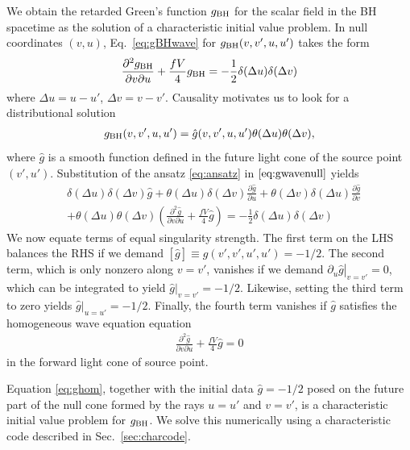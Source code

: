 \begin{refsection}
We obtain the retarded Green's function $g_{\rm BH}$ for the scalar field in the BH spacetime as the solution of a characteristic initial value problem.
In null coordinates $(v,u)$, Eq.~\eqref{eq:gBHwave} for $g_{\rm BH}(v,v',u,u')$ takes the form
\begin{align}
\frac{\partial ^2 g_{\rm BH}}{\partial v\partial u}+\frac{fV}{4}g_{\rm BH}=-\frac{1}{2}\delta(\Delta u)\delta(\Delta v) \label{eq:gwavenull}
\end{align}
where $\Delta u =u-u'$, $\Delta v =v-v'$. 
Causality motivates us to look for a distributional solution
\begin{align}
g_{\rm BH}(v,v',u,u')=\hat g(v,v',u,u')\theta(\Delta u)\theta(\Delta v), \label{eq:ansatz}
\end{align}
where $\hat g$ is a smooth function defined in the future light cone of the source point $(v',u')$. Substitution of the ansatz \eqref{eq:ansatz} in $\eqref{eq:gwavenull}$ yields
\begin{align}
&\delta (\Delta u)\delta(\Delta v)\hat g+\theta(\Delta u)\delta(\Delta v)\frac{\partial \hat g}{\partial u} +\theta(\Delta v)\delta (\Delta u)\frac{\partial \hat g}{\partial v} \nonumber \\
&+\theta(\Delta u)\theta(\Delta v)\left(\frac{\partial ^2 \hat g}{\partial v\partial u}+\frac{fV}{4}\hat g\right)=-\frac{1}{2}\delta (\Delta u)\delta(\Delta v)
\end{align}
We now equate terms of equal singularity strength.
The first term on the LHS balances the RHS if we demand $[\hat g]\equiv g(v',v',u',u')=-1/2$. The second term, which is only nonzero along $v=v'$, vanishes if we demand $\left.\partial_u \hat g\right |_{v=v'}=0$, which can be integrated to yield $\hat g|_{v=v'}=-1/2$. Likewise, setting the third term to zero yields $\hat g|_{u=u'}=-1/2$. Finally, the fourth term vanishes if $\hat g$ satisfies the homogeneous wave equation equation 
\begin{align}
\frac{\partial ^2 \hat g}{\partial v\partial u}+\frac{fV}{4}\hat g =0 
\label{eq:ghom}
\end{align}
in the forward light cone of source point.

Equation \eqref{eq:ghom}, together with the initial data $\hat g =-1/2$ posed on the future part of the null cone formed by the rays $u=u'$ and $v=v'$, is a characteristic initial value problem for $g_{\rm BH}$.
We solve this numerically using a characteristic code described in Sec.~\ref{sec:charcode}.


\end{refsection}

